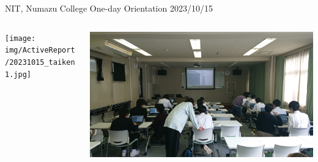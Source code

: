 \documentclass[dvipdfmx, unicode, 169]{beamer}
\begin{document}
\begin{frame}{NIT, Numazu College One-day Orientation 2023/10/15}
  \begin{columns}[T]
    \begin{column}{0.5\linewidth}
      \texttt{[image: img/ActiveReport/20231015\_taiken1.jpg]}
    \end{column}
    \begin{column}{0.5\linewidth}
      \includegraphics[width=\linewidth]{img/ActiveReport/20231015_taiken2.jpg}
    \end{column}
  \end{columns}
\end{frame}
\end{document}
